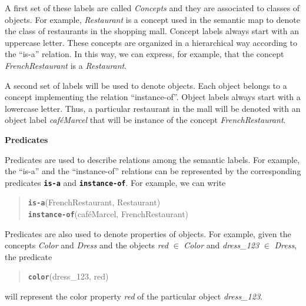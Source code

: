 A first set of these labels are called \emph{Concepts} and they are associated to classes of objects. For example, \emph{Restaurant} is a concept used in the semantic map to denote the class of restaurants in the shopping mall. Concept labels always start with an uppercase letter.
These concepts are organized in a hierarchical way according to the ``is-a'' relation.
In this way, we can express, for example, that the concept \emph{FrenchRestaurant} is a \emph{Restaurant}. 

A second set of labels will be used to denote objects. Each object belongs to a concept implementing the relation ``instance-of''. Object labels always start with a lowercase letter.
Thus, a particular restaurant in the mall will be denoted with an object label \emph{caf\'eMarcel} that will be instance of the concept \emph{FrenchRestaurant}. 

\vspace{1em}

\noindent 
\textbf{Predicates}

Predicates are used to describe relations among the semantic labels. For example, the ``is-a'' and the ``instance-of'' relations can be represented by the corresponding predicates {\tt\bf is-a} and {\tt\bf instance-of}. For example, we can write

\begin{quote}
{\tt\bf is-a}(FrenchRestaurant, Restaurant)\\
{\tt\bf instance-of}(caf\'eMarcel, FrenchRestaurant)\\
\end{quote}



Predicates are also used to denote properties of objects. For example, given the concepts \emph{Color} and \emph{Dress} and the objects \emph{red} $\in$ \emph{Color} and \emph{dress\_123} $\in$ \emph{Dress}, the predicate 

\begin{quote}
{\tt\bf color}(dress\_123,  red)
\end{quote}

\noindent
will represent the color property \emph{red} of the particular object  \emph{dress\_123}.




